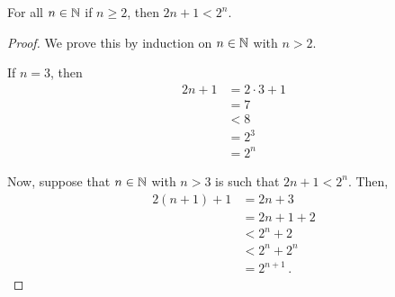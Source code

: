 \guard

\begin{prop}
\label{prop:nthOddLessThan2ToTheN}
  For all $n\in\mathbb{N}$ if $n\geq 2$, then $2n+1 < 2^n$.
\end{prop}
\begin{proof}
  We prove this by induction on $n\in\mathbb{N}$ with $n>2$.

  If $n=3$, then
  \begin{align*}
    2n+1  &= 2\cdot 3 + 1 \\
          &= 7 \\
          &< 8 \\
          &= 2^3 \\
          &= 2^n
  \end{align*}

  Now, suppose that $n\in\mathbb{N}$ with $n>3$ is such that $2n+1 < 2^n$.
  Then,
  \begin{align*}
    2(n+1)+1  &= 2n + 3 \\
              &= 2n + 1 + 2 \\
              &< 2^n + 2 \\
              &< 2^n + 2^n \\
              &= 2^{n+1}\,.
  \end{align*}
\end{proof}
